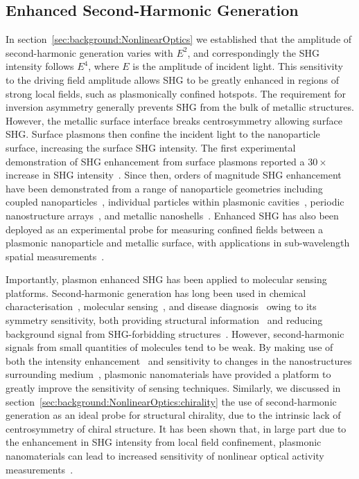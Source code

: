 \subsection{Enhanced Second-Harmonic Generation}\label{sec:background:NonlinearOptics:plasmonic}
In section~\ref{sec:background:NonlinearOptics} we established that the amplitude of second-harmonic generation varies with $E^2$, and correspondingly the SHG intensity follows $E^4$, where $E$ is the amplitude of incident light. This sensitivity to the driving field amplitude allows SHG to be greatly enhanced in regions of strong local fields, such as plasmonically confined hotspots. The requirement for inversion asymmetry generally prevents SHG from the bulk of metallic structures. However, the metallic surface interface breaks centrosymmetry allowing surface SHG. Surface plasmons then confine the incident light to the nanoparticle surface, increasing the surface SHG intensity. 
The first experimental demonstration of SHG enhancement from surface plasmons reported a $30\times$ increase in SHG intensity~\cite{Simon1974}. Since then, orders of magnitude SHG enhancement have been demonstrated from a range of nanoparticle geometries including coupled nanoparticles~\cite{Yildiz2015}, individual particles within plasmonic cavities~\cite{Xiong2016}, periodic nanostructure arrays~\cite{Valev2011b}, and metallic nanoshells~\cite{Pu2010}. Enhanced SHG has also been deployed as an experimental probe for measuring confined fields between a plasmonic nanoparticle and metallic surface, with applications in sub-wavelength spatial measurements~\cite{Shen2015a}. 

Importantly, plasmon enhanced SHG has been applied to molecular sensing platforms. Second-harmonic generation has long been used in chemical characterisation~\cite{Chowdhury2016}, molecular sensing~\cite{Tran2017}, and disease diagnosis~\cite{Campagnola2011} owing to its symmetry sensitivity, both providing structural information~\cite{Gott2001} and reducing background signal from SHG-forbidding structures~\cite{Wanapun2010}. 
However, second-harmonic signals from small quantities of molecules tend to be weak. By making use of both the intensity enhancement~\cite{Kai2007, Wang2018} and sensitivity to changes in the nanostructures surrounding medium~\cite{Ghirardini2018}, plasmonic nanomaterials have provided a platform to greatly improve the sensitivity of sensing techniques.
Similarly, we discussed in section~\ref{sec:background:NonlinearOptics:chirality} the use of second-harmonic generation as an ideal probe for structural chirality, due to the intrinsic lack of centrosymmetry of chiral structure. It has been shown that, in large part due to the enhancement in SHG intensity from local field confinement, plasmonic nanomaterials can lead to increased sensitivity of nonlinear optical activity measurements~\cite{Valev2012a, Chen2016, Huttunen2011}.


